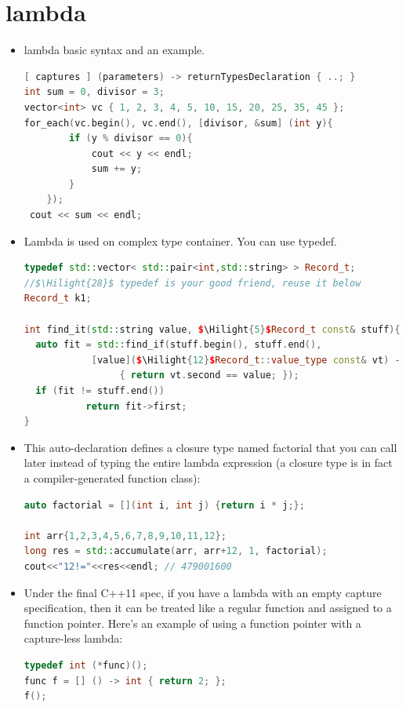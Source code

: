 \documentclass[a4paper,11pt,twoside]{book}
\newcommand{\Hilight}[1]{\makebox[0pt][l]{\color{yellow}\rule[-3pt]{#1em}{11pt}}}
\newcommand{\Hilight}[1]{}
\begin{document}
\section{lambda}

\begin{itemize}
\item lambda basic syntax and an example.
\begin{lstlisting}[frame=single, language=c++]
[ captures ] (parameters) -> returnTypesDeclaration { ..; }
int sum = 0, divisor = 3;
vector<int> vc { 1, 2, 3, 4, 5, 10, 15, 20, 25, 35, 45 };
for_each(vc.begin(), vc.end(), [divisor, &sum] (int y){
		if (y % divisor == 0){
			cout << y << endl;
			sum += y;
		}
	});
 cout << sum << endl;
\end{lstlisting}

\item Lambda is used on complex type container. You can use typedef.
\begin{lstlisting}[frame=single, language=c++, mathescape=true]
typedef std::vector< std::pair<int,std::string> > Record_t;
//$\Hilight{28}$ typedef is your good friend, reuse it below
Record_t k1;

int find_it(std::string value, $\Hilight{5}$Record_t const& stuff){
  auto fit = std::find_if(stuff.begin(), stuff.end(),
            [value]($\Hilight{12}$Record_t::value_type const& vt) -> bool
                 { return vt.second == value; });
  if (fit != stuff.end())
           return fit->first;
}
\end{lstlisting}

\item This auto-declaration defines a closure type named factorial that you can call later instead of typing the entire lambda expression (a closure type is in fact a compiler-generated function class):
\begin{lstlisting}[frame=single, language=c++]
auto factorial = [](int i, int j) {return i * j;};

int arr{1,2,3,4,5,6,7,8,9,10,11,12};
long res = std::accumulate(arr, arr+12, 1, factorial);
cout<<"12!="<<res<<endl; // 479001600
\end{lstlisting}

\item Under the final C++11 spec, if you have a lambda with an empty capture specification, then it can be treated like a regular function and assigned to a function pointer. Here's an example of using a function pointer with a capture-less lambda:
\begin{lstlisting}[frame=single, language=c++]
typedef int (*func)();
func f = [] () -> int { return 2; };
f();
\end{lstlisting}


\end{itemize}
\end{document}
